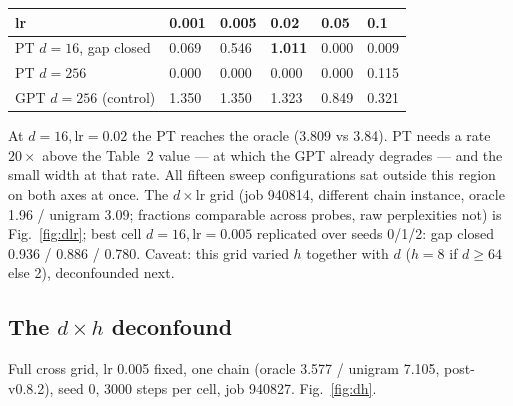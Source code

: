 \documentclass[10pt,a4paper]{article}
\begin{document}
\begin{table}[h]\centering\small
\begin{tabular}{llllll}
\toprule
lr & 0.001 & 0.005 & 0.02 & 0.05 & 0.1\\
\midrule
PT $d{=}16$, gap closed & 0.069 & 0.546 & \textbf{1.011} & 0.000 & 0.009\\
PT $d{=}256$ & 0.000 & 0.000 & 0.000 & 0.000 & 0.115\\
GPT $d{=}256$ (control) & 1.350 & 1.350 & 1.323 & 0.849 & 0.321\\
\bottomrule
\end{tabular}
\end{table}

At $d{=}16, \mathrm{lr}{=}0.02$ the PT reaches the oracle (3.809 vs 3.84). PT needs a rate
$20\times$ above the Table~2 value --- at which the GPT already degrades --- and the small
width at that rate. All fifteen sweep configurations sat outside this region on both axes at
once. The $d \times \mathrm{lr}$ grid (job 940814, different chain instance, oracle 1.96 /
unigram 3.09; fractions comparable across probes, raw perplexities not) is
Fig.~\ref{fig:dlr}; best cell $d{=}16, \mathrm{lr}{=}0.005$ replicated over seeds 0/1/2: gap
closed 0.936 / 0.886 / 0.780. Caveat: this grid varied $h$ together with $d$
($h = 8$ if $d \ge 64$ else 2), deconfounded next.

\subsection{The $d \times h$ deconfound}

Full cross grid, lr 0.005 fixed, one chain (oracle 3.577 / unigram 7.105, post-v0.8.2), seed
0, 3000 steps per cell, job 940827. Fig.~\ref{fig:dh}.
\end{document}
